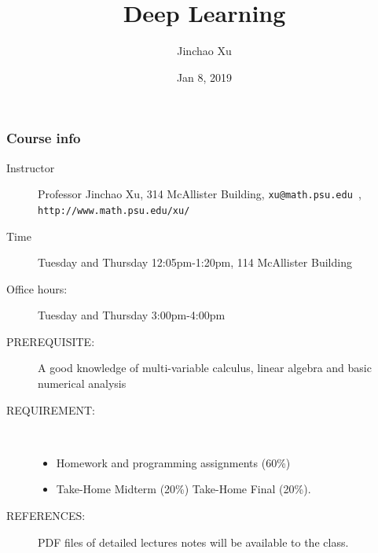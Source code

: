\documentclass{beamer}
\begin{document}
\begin{CJK*}{UTF8}{gbsn}


\title
{Deep Learning}

\author[Jinchao Xu]{Jinchao Xu}


\date{Jan 8, 2019}

\begin{frame}
\titlepage


\end{frame}


\begin{frame}\frametitle{Course info} 
\begin{description}
\item[Instructor] Professor Jinchao Xu, 314 McAllister Building, {\color{blue}\tt xu@math.psu.edu }, {\color{blue}\tt http://www.math.psu.edu/xu/}
\item[Time] Tuesday and Thursday 12:05pm-1:20pm, 114 McAllister Building
\item[Office hours:] Tuesday and Thursday 3:00pm-4:00pm
\item[PREREQUISITE:]
A good knowledge of multi-variable calculus, linear
algebra and basic numerical analysis

\item[REQUIREMENT:  ]$\quad$

  \begin{itemize}
  \item Homework and programming assignments  (60\%) 
\item Take-Home Midterm (20\%) Take-Home Final (20\%).
  \end{itemize}
\item[REFERENCES:]  PDF files of detailed lectures notes will be available to
the  class.
\end{description}

\end{frame}





\end{CJK*}
\end{document}

